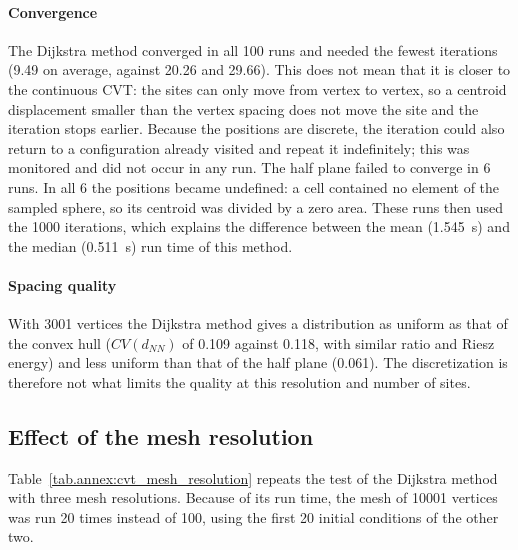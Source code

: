 \paragraph{Convergence} The Dijkstra method converged in all 100 runs and needed the fewest iterations (9.49 on average, against 20.26 and 29.66). This does not mean that it is closer to the continuous \gls{CVT}: the sites can only move from vertex to vertex, so a centroid displacement smaller than the vertex spacing does not move the site and the iteration stops earlier. Because the positions are discrete, the iteration could also return to a configuration already visited and repeat it indefinitely; this was monitored and did not occur in any run. The half plane failed to converge in 6 runs. In all 6 the positions became undefined: a cell contained no element of the sampled sphere, so its centroid was divided by a zero area. These runs then used the 1000 iterations, which explains the difference between the mean (1.545~s) and the median (0.511~s) run time of this method.

\paragraph{Spacing quality} With 3001 vertices the Dijkstra method gives a distribution as uniform as that of the convex hull ($CV(d_{NN})$ of 0.109 against 0.118, with similar ratio and Riesz energy) and less uniform than that of the half plane (0.061). The discretization is therefore not what limits the quality at this resolution and number of sites.

\subsection{Effect of the mesh resolution}

Table~\ref{tab.annex:cvt_mesh_resolution} repeats the test of the Dijkstra method with three mesh resolutions. Because of its run time, the mesh of 10001 vertices was run 20 times instead of 100, using the first 20 initial conditions of the other two.

